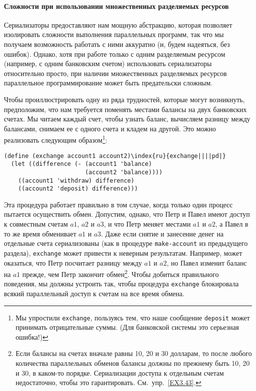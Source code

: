 \paragraph{Сложности при использовании множественных разделяемых
ресурсов}


Сериализаторы предоставляют нам мощную абстракцию,
которая позволяет изолировать сложности выполнения параллельных программ, так
что мы получаем возможность работать с ними аккуратно (и, будем
надеяться, без ошибок).  Однако, хотя при работе только с одним
разделяемым ресурсом (например, с одним банковским счетом)
использовать сериализаторы относительно просто, при наличии
множественных разделяемых ресурсов параллельное программирование может
быть предательски сложным.

Чтобы проиллюстрировать одну из ряда трудностей, которые могут
возникнуть, предположим, что нам требуется
поменять местами балансы на
двух банковских счетах.  Мы читаем каждый счет, чтобы узнать баланс,
вычисляем разницу между балансами, снимаем ее с одного счета и кладем
на другой.  Это можно реализовать следующим образом\footnote{Мы упростили {\tt exchange}, пользуясь тем,
что наше сообщение {\tt deposit} может принимать
отрицательные суммы. (Для банковской системы это серьезная ошибка!)
}:

\begin{Verbatim}[fontsize=\small]
(define (exchange account1 account2)\index{ru}{exchange||||pd|}
  (let ((difference (- (account1 'balance)
                       (account2 'balance))))
    ((account1 'withdraw) difference)
    ((account2 'deposit) difference)))
\end{Verbatim}

Эта процедура работает правильно в том случае,
когда только один процесс пытается осуществить обмен.  Допустим,
однако, что Петр и Павел имеют доступ к совместным счетам
$a1$, $a2$ и $a3$, и что Петр
меняет местами $a1$ и $a2$, а Павел в то же время
обменивает $a1$ и $a3$.  Даже если снятие и
занесение денег на отдельные счета сериализованы (как в процедуре
{\tt make-account} из предыдущего раздела),
{\tt exchange} может привести к неверным результатам.
Например, может оказаться, что Петр посчитает разницу между $a1$ и
$a2$, но Павел изменит баланс на $a1$ прежде, чем Петр
закончит обмен\footnote{Если балансы на счетах вначале равны 10, 20 и 30
долларам, то после любого количества параллельных обменов балансы
должны по прежнему быть 10, 20 и 30, в каком-то порядке.  Сериализации
доступа к отдельным счетам недостаточно, чтобы это
гарантировать. См.~упр.~\ref{EX3.43}.
}.
Чтобы добиться правильного поведения, мы должны устроить так, чтобы
процедура {\tt exchange} блокировала всякий параллельный доступ к
счетам на все время обмена.

